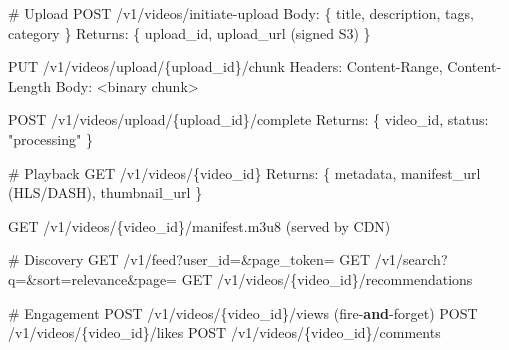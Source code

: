 \documentclass[11pt]{article}
\newenvironment{Shaded}{\begin{snugshade}}{\end{snugshade}}
\newcommand{\CommentTok}[1]{\textcolor[rgb]{0.48,0.49,0.49}{#1}}
\newcommand{\KeywordTok}[1]{\textcolor[rgb]{0.81,0.81,0.76}{\textbf{#1}}}
\newcommand{\NormalTok}[1]{\textcolor[rgb]{0.81,0.81,0.76}{#1}}
\newcommand{\OperatorTok}[1]{\textcolor[rgb]{0.81,0.81,0.76}{#1}}
\newcommand{\StringTok}[1]{\textcolor[rgb]{0.96,0.31,0.31}{#1}}
\begin{document}
\begin{Shaded}
\begin{Highlighting}[]
\CommentTok{\# Upload}
\NormalTok{POST   }\OperatorTok{/}\NormalTok{v1}\OperatorTok{/}\NormalTok{videos}\OperatorTok{/}\NormalTok{initiate}\OperatorTok{{-}}\NormalTok{upload}
\NormalTok{       Body: \{ title, description, tags, category \}}
\NormalTok{       Returns: \{ upload\_id, upload\_url (signed S3) \}}

\NormalTok{PUT    }\OperatorTok{/}\NormalTok{v1}\OperatorTok{/}\NormalTok{videos}\OperatorTok{/}\NormalTok{upload}\OperatorTok{/}\NormalTok{\{upload\_id\}}\OperatorTok{/}\NormalTok{chunk}
\NormalTok{       Headers: Content}\OperatorTok{{-}}\NormalTok{Range, Content}\OperatorTok{{-}}\NormalTok{Length}
\NormalTok{       Body: }\OperatorTok{\textless{}}\NormalTok{binary chunk}\OperatorTok{\textgreater{}}

\NormalTok{POST   }\OperatorTok{/}\NormalTok{v1}\OperatorTok{/}\NormalTok{videos}\OperatorTok{/}\NormalTok{upload}\OperatorTok{/}\NormalTok{\{upload\_id\}}\OperatorTok{/}\NormalTok{complete}
\NormalTok{       Returns: \{ video\_id, status: }\StringTok{"processing"}\NormalTok{ \}}

\CommentTok{\# Playback}
\NormalTok{GET    }\OperatorTok{/}\NormalTok{v1}\OperatorTok{/}\NormalTok{videos}\OperatorTok{/}\NormalTok{\{video\_id\}}
\NormalTok{       Returns: \{ metadata, manifest\_url (HLS}\OperatorTok{/}\NormalTok{DASH), thumbnail\_url \}}

\NormalTok{GET    }\OperatorTok{/}\NormalTok{v1}\OperatorTok{/}\NormalTok{videos}\OperatorTok{/}\NormalTok{\{video\_id\}}\OperatorTok{/}\NormalTok{manifest.m3u8   (served by CDN)}

\CommentTok{\# Discovery}
\NormalTok{GET    }\OperatorTok{/}\NormalTok{v1}\OperatorTok{/}\NormalTok{feed?user\_id}\OperatorTok{=\&}\NormalTok{page\_token}\OperatorTok{=}
\NormalTok{GET    }\OperatorTok{/}\NormalTok{v1}\OperatorTok{/}\NormalTok{search?q}\OperatorTok{=\&}\NormalTok{sort}\OperatorTok{=}\NormalTok{relevance}\OperatorTok{\&}\NormalTok{page}\OperatorTok{=}
\NormalTok{GET    }\OperatorTok{/}\NormalTok{v1}\OperatorTok{/}\NormalTok{videos}\OperatorTok{/}\NormalTok{\{video\_id\}}\OperatorTok{/}\NormalTok{recommendations}

\CommentTok{\# Engagement}
\NormalTok{POST   }\OperatorTok{/}\NormalTok{v1}\OperatorTok{/}\NormalTok{videos}\OperatorTok{/}\NormalTok{\{video\_id\}}\OperatorTok{/}\NormalTok{views      (fire}\OperatorTok{{-}}\KeywordTok{and}\OperatorTok{{-}}\NormalTok{forget)}
\NormalTok{POST   }\OperatorTok{/}\NormalTok{v1}\OperatorTok{/}\NormalTok{videos}\OperatorTok{/}\NormalTok{\{video\_id\}}\OperatorTok{/}\NormalTok{likes}
\NormalTok{POST   }\OperatorTok{/}\NormalTok{v1}\OperatorTok{/}\NormalTok{videos}\OperatorTok{/}\NormalTok{\{video\_id\}}\OperatorTok{/}\NormalTok{comments}
\end{Highlighting}
\end{Shaded}
\end{document}
